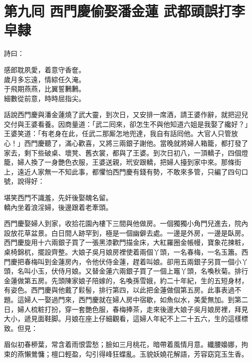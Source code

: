 
\chapter*{第九囘 西門慶偷娶潘金蓮 武都頭誤打李皁隸}


詩曰：

\begin{myquote}
感郎耽夙愛，着意守香奩。\\歲月多忘遠，情綜任久淹。\\于飛期燕燕，比翼誓鶼鶼。\\細數從前意，時時屈指尖。
\end{myquote}

話說西門慶與潘金蓮燒了武大靈，到次日，又安排一席酒，請王婆作辭，就把迎兒交付與王婆看養。因商量道：「武二囘來，卻怎生不與他知道六姐是我娶了纔好？」王婆笑道：「有老身在此，任武二那厮怎地兜達，我自有話囘他。大官人只管放心！」西門慶聽了，滿心歡喜，又將三兩銀子謝他。當晚就將婦人箱籠，都打發了家去，剩下些破桌、壞凳、舊衣裳，都與了王婆。到次日初八，一頂轎子，四個燈籠，婦人換了一身艷色衣服，王婆送親，玳安跟轎，把婦人擡到家中來。那條街上，遠近人家無一不知此事，都懼怕西門慶有錢有勢，不敢來多管，只編了四句口號，說得好：

\begin{myquote}
堪笑西門不識羞，先奸後娶醜名留。\\轎內坐着浪淫婦，後邊跟着老牽頭。
\end{myquote}

西門慶娶婦人到家，收拾花園內樓下三間與他做房。一個獨獨小角門兒進去，院內設放花草盆景。白日間人跡罕到，極是一個幽僻去處。一邊是外房，一邊是臥房。西門慶旋用十六兩銀子買了一張黑漆歡門描金床，大紅羅圈金帳幔，寶象花揀粧，桌椅錦杌，擺設齊整。大娘子吳月娘房裡使着兩個丫頭，一名春梅，一名玉簫。西門慶把春梅叫到金蓮房內，令他伏侍金蓮，趕着叫娘。卻用五兩銀子另買一個小丫頭，名叫小玉，伏侍月娘。又替金蓮六兩銀子買了一個上竈丫頭，名喚秋菊。排行金蓮做第五房。先頭陳家娘子陪嫁的，名喚孫雪娥，約二十年紀，生的五短身材，有姿色。西門慶與他戴了鬏髻，排行第四，以此把金蓮做個第五房。此事表過不題。這婦人一娶過門來，西門慶就在婦人房中宿歇，如魚似水，美愛無加。到第二日，婦人梳粧打扮，穿一套艷色服，春梅捧茶，走來後邊大娘子吳月娘房裡，拜見大小，遞見面鞋脚。月娘在座上仔細觀看，這婦人年紀不上二十五六，生的這樣標致。但見：

\begin{myquote}
眉似初春桺葉，常含着雨恨雲愁；臉如三月桃花，暗帶着風情月意。纖腰嬝娜，拘束的燕懶鶯慵；檀口輕盈，勾引得峰狂蝶亂。玉貌妖嬈花解語，芳容窈窕玉生香。
\end{myquote}

